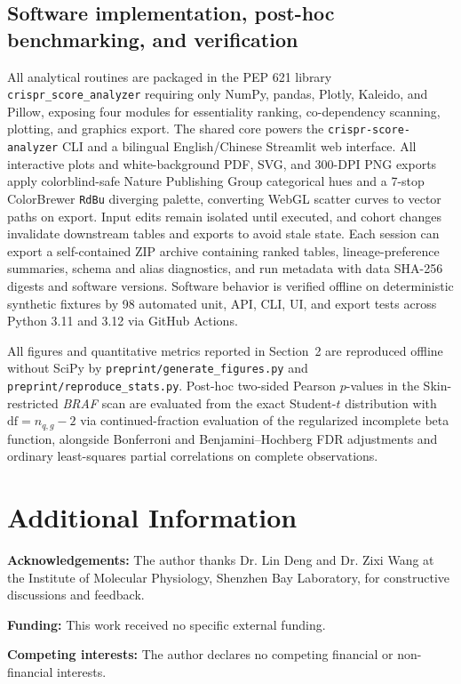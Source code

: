 \documentclass[11pt,a4paper]{article}
\begin{document}
\subsection{Software implementation, post-hoc benchmarking, and verification}
All analytical routines are packaged in the PEP 621 library \texttt{crispr\_score\_analyzer} requiring only NumPy, pandas, Plotly, Kaleido, and Pillow, exposing four modules for essentiality ranking, co-dependency scanning, plotting, and graphics export. The shared core powers the \texttt{crispr-score-analyzer} CLI and a bilingual English/Chinese Streamlit web interface. All interactive plots and white-background PDF, SVG, and 300-DPI PNG exports apply colorblind-safe Nature Publishing Group categorical hues and a 7-stop ColorBrewer \texttt{RdBu} diverging palette, converting WebGL scatter curves to vector paths on export. Input edits remain isolated until executed, and cohort changes invalidate downstream tables and exports to avoid stale state. Each session can export a self-contained ZIP archive containing ranked tables, lineage-preference summaries, schema and alias diagnostics, and run metadata with data SHA-256 digests and software versions. Software behavior is verified offline on deterministic synthetic fixtures by 98 automated unit, API, CLI, UI, and export tests across Python 3.11 and 3.12 via GitHub Actions.

All figures and quantitative metrics reported in Section~2 are reproduced offline without SciPy by \texttt{preprint/generate\_figures.py} and \texttt{preprint/reproduce\_stats.py}. Post-hoc two-sided Pearson $p$-values in the Skin-restricted \textit{BRAF} scan are evaluated from the exact Student-$t$ distribution with $\mathrm{df} = n_{q,g} - 2$ via continued-fraction evaluation of the regularized incomplete beta function, alongside Bonferroni and Benjamini--Hochberg FDR adjustments and ordinary least-squares partial correlations on complete observations.

\section*{Additional Information}
\textbf{Acknowledgements:} The author thanks Dr. Lin Deng and Dr. Zixi Wang at the Institute of Molecular Physiology, Shenzhen Bay Laboratory, for constructive discussions and feedback.

\textbf{Funding:} This work received no specific external funding.

\textbf{Competing interests:} The author declares no competing financial or non-financial interests.
\end{document}
